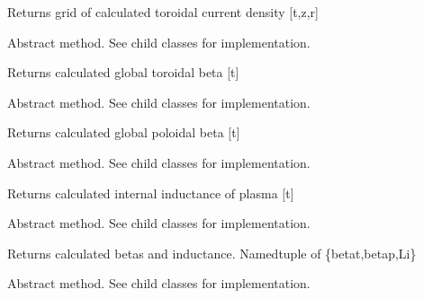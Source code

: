 \documentclass[letterpaper,10pt,english]{sphinxmanual}
\begin{document}
\begin{fulllineitems}
\begin{fulllineitems}
Returns grid of calculated toroidal current density {[}t,z,r{]}

\end{fulllineitems}


\begin{fulllineitems}
\label{eqtools:eqtools.core.Equilibrium.getBetaT}
Abstract method.  See child classes for implementation.

Returns calculated global toroidal beta {[}t{]}

\end{fulllineitems}


\begin{fulllineitems}
\label{eqtools:eqtools.core.Equilibrium.getBetaP}
Abstract method.  See child classes for implementation.

Returns calculated global poloidal beta {[}t{]}

\end{fulllineitems}


\begin{fulllineitems}
\label{eqtools:eqtools.core.Equilibrium.getLi}
Abstract method.  See child classes for implementation.

Returns calculated internal inductance of plasma {[}t{]}

\end{fulllineitems}


\begin{fulllineitems}
\label{eqtools:eqtools.core.Equilibrium.getBetas}
Abstract method.  See child classes for implementation.

Returns calculated betas and inductance.
Namedtuple of \{betat,betap,Li\}

\end{fulllineitems}


\begin{fulllineitems}
\label{eqtools:eqtools.core.Equilibrium.getDiamagFlux}
Abstract method.  See child classes for implementation.


\end{fulllineitems}
\end{fulllineitems}
\end{document}

